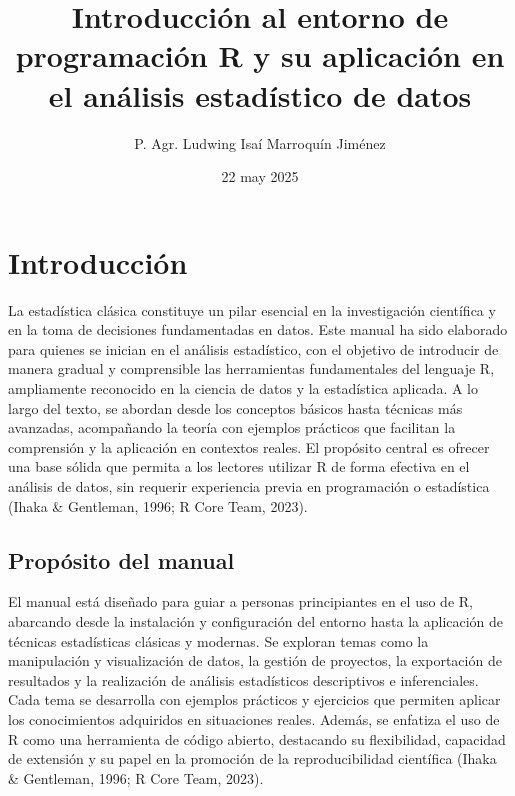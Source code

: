 \documentclass[
  spanish,
  a4paper,
  DIV=11,
  numbers=noendperiod,
  onepage,
  openany]{scrreprt}
\title{Introducción al entorno de programación R y su aplicación en el
análisis estadístico de datos}
\author{P. Agr. Ludwing Isaí Marroquín Jiménez}
\date{22 may 2025}
\renewcommand*\contentsname{Tabla de contenidos}
\newcommand\contentsname{Tabla de contenidos}
\begin{document}
\maketitle

\renewcommand*\contentsname{Tabla de contenidos}
{
\hypersetup{linkcolor=}
\setcounter{tocdepth}{2}
\tableofcontents
}


\chapter*{Introducción}\label{introducciuxf3n}


La estadística clásica constituye un pilar esencial en la investigación
científica y en la toma de decisiones fundamentadas en datos. Este
manual ha sido elaborado para quienes se inician en el análisis
estadístico, con el objetivo de introducir de manera gradual y
comprensible las herramientas fundamentales del lenguaje R, ampliamente
reconocido en la ciencia de datos y la estadística aplicada. A lo largo
del texto, se abordan desde los conceptos básicos hasta técnicas más
avanzadas, acompañando la teoría con ejemplos prácticos que facilitan la
comprensión y la aplicación en contextos reales. El propósito central es
ofrecer una base sólida que permita a los lectores utilizar R de forma
efectiva en el análisis de datos, sin requerir experiencia previa en
programación o estadística (Ihaka \& Gentleman, 1996; R Core Team,
2023).

\section*{Propósito del manual}\label{propuxf3sito-del-manual}


El manual está diseñado para guiar a personas principiantes en el uso de
R, abarcando desde la instalación y configuración del entorno hasta la
aplicación de técnicas estadísticas clásicas y modernas. Se exploran
temas como la manipulación y visualización de datos, la gestión de
proyectos, la exportación de resultados y la realización de análisis
estadísticos descriptivos e inferenciales. Cada tema se desarrolla con
ejemplos prácticos y ejercicios que permiten aplicar los conocimientos
adquiridos en situaciones reales. Además, se enfatiza el uso de R como
una herramienta de código abierto, destacando su flexibilidad, capacidad
de extensión y su papel en la promoción de la reproducibilidad
científica (Ihaka \& Gentleman, 1996; R Core Team, 2023).
\end{document}
